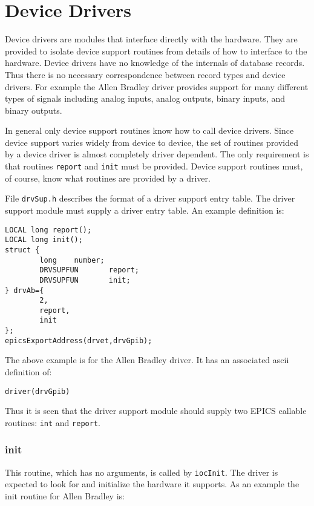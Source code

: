 \section{Device Drivers}

Device drivers are modules that interface directly with the hardware. They are provided to isolate device support routines 
from details of how to interface to the hardware. Device drivers have no knowledge of the internals of database records. 
Thus there is no necessary correspondence between record types and device drivers. For example the Allen Bradley driver 
provides support for many different types of signals including analog inputs, analog outputs, binary inputs, and binary 
outputs. 

In general only device support routines know how to call device drivers. Since device support varies widely from device 
to device, the set of routines provided by a device driver is almost completely driver dependent. The only requirement is 
that routines \verb|report| and \verb|init| must be provided. Device support routines must, of course, know what routines are 
provided by a driver.

File \verb|drvSup.h| describes the format of a driver support entry table. The driver support module must supply a driver entry 
table. An example definition is:

\begin{verbatim}LOCAL long report();
LOCAL long init();
struct {
        long    number;
        DRVSUPFUN       report;
        DRVSUPFUN       init;
} drvAb={
        2,
        report,
        init
};
epicsExportAddress(drvet,drvGpib);
\end{verbatim}The above example is for the Allen Bradley driver. It has an associated ascii definition of:

\begin{verbatim}driver(drvGpib)
\end{verbatim}Thus it is seen that the driver support module should supply two EPICS callable routines: \verb|int| and \verb|report|.

\subsubsection{init}

This routine, which has no arguments, is called by \verb|iocInit|. The driver is expected to look for and initialize the 
hardware it supports. As an example the init routine for Allen Bradley is:


